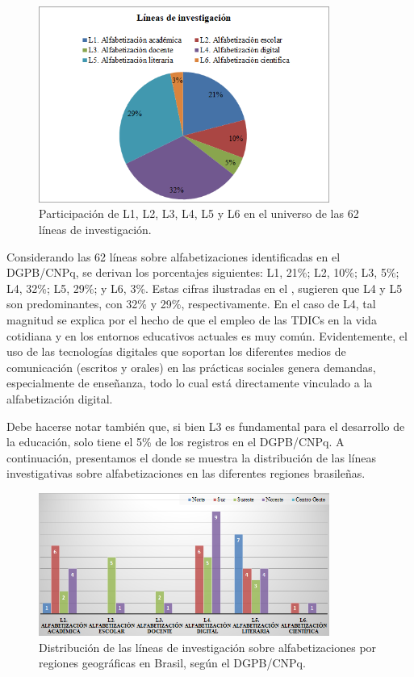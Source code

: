 \documentclass{textolivre}
\begin{document}
\begin{figure}[htbp]
 \centering
 \includegraphics[width=0.85\textwidth]{Fig01.png}
 \caption{Participación de L1, L2, L3, L4, L5 y L6 en el universo de las 62 líneas de investigación.}
 \label{fig01}
\end{figure}

Considerando las 62 líneas sobre alfabetizaciones identificadas en el DGPB/CNPq, se derivan los porcentajes siguientes: L1, 21\%; L2, 10\%; L3, 5\%; L4, 32\%; L5, 29\%; y L6, 3\%. Estas cifras ilustradas en el , sugieren que L4 y L5 son predominantes, con 32\% y 29\%, respectivamente. En el caso de L4, tal magnitud se explica por el hecho de que el empleo de las TDICs en la vida cotidiana y en los entornos educativos actuales es muy común. Evidentemente, el uso de las tecnologías digitales que soportan los diferentes medios de comunicación (escritos y orales) en las prácticas sociales genera demandas, especialmente de enseñanza, todo lo cual está directamente vinculado a la alfabetización digital.  

Debe hacerse notar también que, si bien L3 es fundamental para el desarrollo de la educación, solo tiene el 5\% de los registros en el DGPB/CNPq. A continuación, presentamos el  donde se muestra la distribución de las líneas investigativas sobre alfabetizaciones en las diferentes regiones brasileñas.

\begin{figure}[htbp]
 \centering
 \includegraphics[width=0.85\textwidth]{Fig02.png}
 \caption{Distribución de las líneas de investigación sobre alfabetizaciones por regiones geográficas en Brasil, según el DGPB/CNPq.}
 \label{fig02}
\end{figure}
\end{document}
